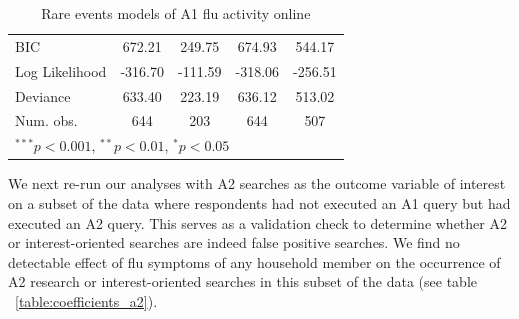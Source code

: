 \documentclass[12pt]{article}
\begin{document}
\begin{table}
\begin{center}
\begin{tabular}{l c c c c }
BIC            & 672.21         & 249.75         & 674.93         & 544.17         \\
Log Likelihood & -316.70        & -111.59        & -318.06        & -256.51        \\
Deviance       & 633.40         & 223.19         & 636.12         & 513.02         \\
Num. obs.      & 644            & 203            & 644            & 507            \\
\hline
\multicolumn{5}{l}{\scriptsize{$^{***}p<0.001$, $^{**}p<0.01$, $^*p<0.05$}}
\end{tabular}
\caption{Rare events models of A1 flu activity online}
\label{table:coefficients_a1}
\end{center}
\end{table}

\clearpage
\newpage

We next re-run our analyses with A2 searches as the outcome variable of interest on a subset of the data where respondents had not executed an A1 query but had executed an A2 query. This serves as a validation check to determine whether A2 or interest-oriented searches are indeed false positive searches. We find no detectable effect of flu symptoms of any household member on the occurrence of A2 research or interest-oriented searches in this subset of the data (see table ~\ref{table:coefficients_a2}).  
\end{document}
